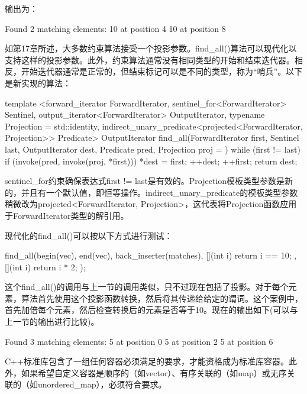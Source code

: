 输出为：

\begin{shell}
Found 2 matching elements:
10 at position 4
10 at position 8
\end{shell}


如第17章所述，大多数约束算法接受一个投影参数。find\_all()算法可以现代化以支持这样的投影参数。此外，约束算法通常没有相同类型的开始和结束迭代器。相反，开始迭代器通常是正常的，但结束标记可以是不同的类型，称为“哨兵”。以下是新实现的算法：

\begin{cpp}
template <forward_iterator ForwardIterator,
    sentinel_for<ForwardIterator> Sentinel,
    output_iterator<ForwardIterator> OutputIterator,
    typename Projection = std::identity,
    indirect_unary_predicate<projected<ForwardIterator, Projection>> Predicate>
OutputIterator find_all(ForwardIterator first, Sentinel last,
                        OutputIterator dest, Predicate pred, Projection proj = {})
{
    while (first != last) {
        if (invoke(pred, invoke(proj, *first))) {
            *dest = first;
            ++dest;
        }
        ++first;
    }
    return dest;
}
\end{cpp}

sentinel\_for约束确保表达式first != last是有效的。Projection模板类型参数是新的，并且有一个默认值，即恒等操作。indirect\_unary\_predicate的模板类型参数稍微改为projected<ForwardIterator, Projection>，这代表将Projection函数应用于ForwardIterator类型的解引用。

现代化的find\_all()可以按以下方式进行测试：

\begin{cpp}
find_all(begin(vec), end(vec), back_inserter(matches),
    [](int i) { return i == 10; },
    [](int i) { return i * 2; });
\end{cpp}

这个find\_all()的调用与上一节的调用类似，只不过现在包括了投影。对于每个元素，算法首先使用这个投影函数转换，然后将其传递给给定的谓词。这个案例中，首先加倍每个元素，然后检查转换后的元素是否等于10。现在的输出如下(可以与上一节的输出进行比较)。

\begin{shell}
Found 3 matching elements:
5 at position 0
5 at position 2
5 at position 6
\end{shell}


C++标准库包含了一组任何容器必须满足的要求，才能资格成为标准库容器。此外，如果希望自定义容器是顺序的（如vector）、有序关联的（如map）或无序关联的（如unordered\_map），必须符合要求。

